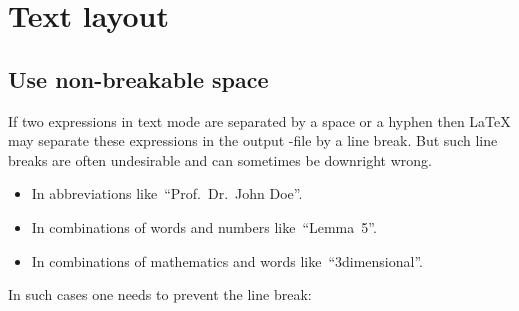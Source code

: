 \section{Text layout}



\subsection{Use non-breakable space}
\label{non-breakable space}

If two expressions in text mode are separated by a space or a hyphen then {\LaTeX} may separate these expressions in the output -file by a line break.
But such line breaks are often undesirable and can sometimes be downright wrong.
\begin{itemize}
  \item
    In abbreviations like~\enquote{Prof.~Dr.~John Doe}.
  \item
    In combinations of words and numbers like~\enquote{Lemma~5}.
  \item
    In combinations of mathematics and words like~\enquote{$3${\nbd}dimensional}.
\end{itemize}
In such cases one needs to prevent the line break:
